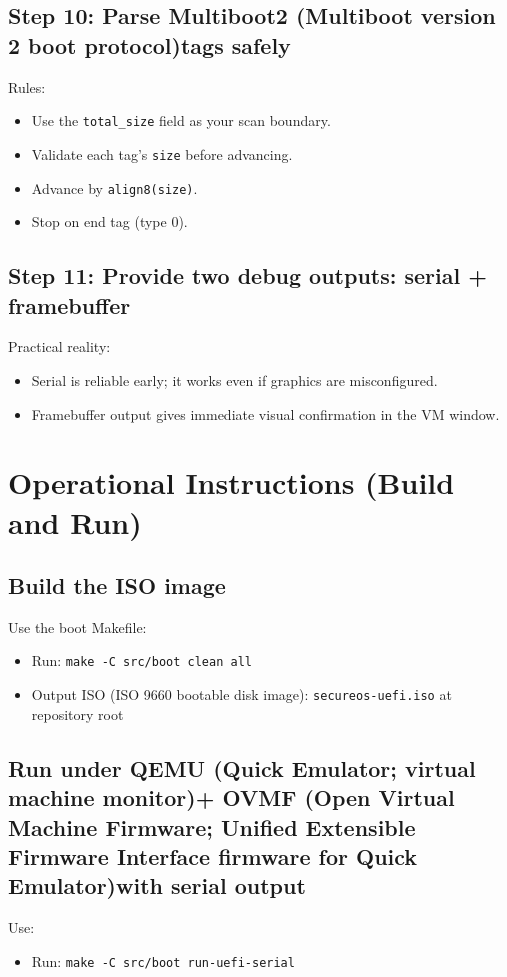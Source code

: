 \documentclass[11pt]{article}
\newcommand{\ISOImg}{ISO (ISO 9660 bootable disk image)}
\newcommand{\MBtwo}{Multiboot2 (Multiboot version 2 boot protocol)}
\newcommand{\OVMF}{OVMF (Open Virtual Machine Firmware; Unified Extensible Firmware Interface firmware for Quick Emulator)}
\newcommand{\QEMU}{QEMU (Quick Emulator; virtual machine monitor)}
\begin{document}
\subsection{Step 10: Parse \MBtwo tags safely}
Rules:
\begin{itemize}
  \item Use the \texttt{total\_size} field as your scan boundary.
  \item Validate each tag’s \texttt{size} before advancing.
  \item Advance by \texttt{align8(size)}.
  \item Stop on end tag (type 0).
\end{itemize}

\subsection{Step 11: Provide two debug outputs: serial + framebuffer}
Practical reality:
\begin{itemize}
  \item Serial is reliable early; it works even if graphics are misconfigured.
  \item Framebuffer output gives immediate visual confirmation in the VM window.
\end{itemize}

\newpage
\section{Operational Instructions (Build and Run)}

\subsection{Build the ISO image}
Use the boot Makefile:
\begin{itemize}
  \item Run: \texttt{make -C src/boot clean all}
  \item Output \ISOImg: \texttt{secureos-uefi.iso} at repository root
\end{itemize}

\subsection{Run under \QEMU + \OVMF with serial output}
Use:
\begin{itemize}
  \item Run: \texttt{make -C src/boot run-uefi-serial}
\end{itemize}
\end{document}
